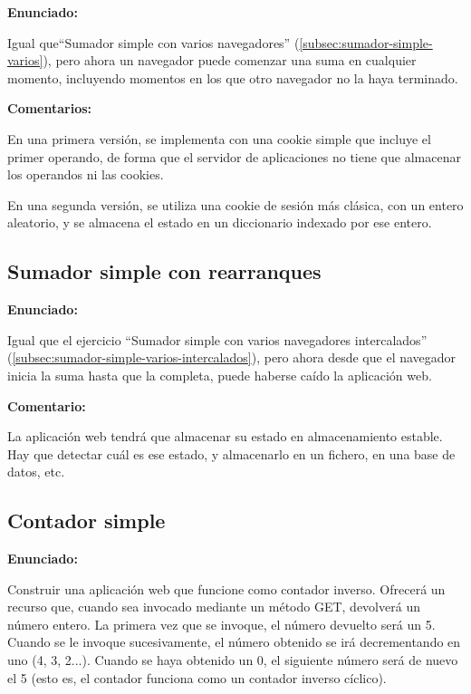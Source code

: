 \textbf{Enunciado:}

Igual que``Sumador simple con varios navegadores'' (\ref{subsec:sumador-simple-varios}), pero ahora un navegador puede comenzar una suma en cualquier momento, incluyendo momentos en los que otro navegador no la haya terminado.

\textbf{Comentarios:}

En una primera versión, se implementa con una cookie simple que incluye el primer operando, de forma que el servidor de aplicaciones no tiene que almacenar los operandos ni las cookies.

En una segunda versión, se utiliza una cookie de sesión más clásica, con un entero aleatorio, y se almacena el estado en un diccionario indexado por ese entero.

\subsection{Sumador simple con rearranques}
\label{subsec:sumador-simple-rearranques}

\textbf{Enunciado:}

Igual que el ejercicio ``Sumador simple con varios navegadores intercalados'' (\ref{subsec:sumador-simple-varios-intercalados}), pero ahora desde que el navegador inicia la suma hasta que la completa, puede haberse caído la aplicación web.

\textbf{Comentario:}

La aplicación web tendrá que  almacenar su estado en almacenamiento estable. Hay que detectar cuál es ese estado, y almacenarlo en  un fichero, en  una base de datos, etc.


\subsection{Contador simple}
\label{subsec:contador-simple}

\textbf{Enunciado:}

Construir una aplicación web que funcione como contador inverso. Ofrecerá un recurso que, cuando sea invocado mediante un método GET, devolverá un número entero. La primera vez que se invoque, el número devuelto será un 5. Cuando se le invoque sucesivamente, el número obtenido se irá decrementando en uno (4, 3, 2...). Cuando se haya obtenido un 0, el siguiente número será de nuevo el 5 (esto es, el contador funciona como un contador inverso cíclico).

